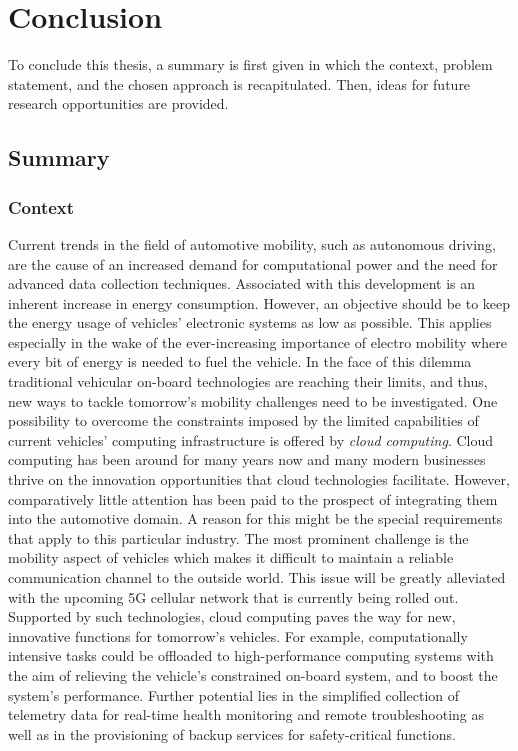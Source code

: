\chapter{Conclusion}\label{chapter:conclusion}
To conclude this thesis, a summary is first given in which the context, problem statement, and the chosen approach is recapitulated. Then, ideas for future research opportunities are provided.

\section{Summary}\label{sec:summary}
\subsection{Context}
Current trends in the field of automotive mobility, such as autonomous driving, are the cause of an increased demand for computational power and the need for advanced data collection techniques. Associated with this development is an inherent increase in energy consumption. However, an objective should be to keep the energy usage of vehicles' electronic systems as low as possible. This applies especially in the wake of the ever-increasing importance of electro mobility where every bit of energy is needed to fuel the vehicle. In the face of this dilemma traditional vehicular on-board technologies are reaching their limits, and thus, new ways to tackle tomorrow's mobility challenges need to be investigated. One possibility to overcome the constraints imposed by the limited capabilities of current vehicles' computing infrastructure is offered by \emph{cloud computing}. Cloud computing has been around for many years now and many modern businesses thrive on the innovation opportunities that cloud technologies facilitate. However, comparatively little attention has been paid to the prospect of integrating them into the automotive domain. A reason for this might be the special requirements that apply to this particular industry. The most prominent challenge is the mobility aspect of vehicles which makes it difficult to maintain a reliable communication channel to the outside world. This issue will be greatly alleviated with the upcoming 5G cellular network that is currently being rolled out. Supported by such technologies, cloud computing paves the way for new, innovative functions for tomorrow's vehicles. For example, computationally intensive tasks could be offloaded to high-performance computing systems with the aim of relieving the vehicle's constrained on-board system, and to boost the system's performance. Further potential lies in the simplified collection of telemetry data for real-time health monitoring and remote troubleshooting as well as in the provisioning of backup services for safety-critical functions.

